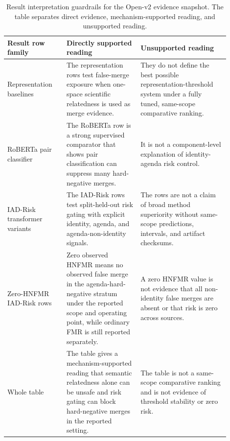 \documentclass[11pt]{article}
\begin{document}
\begin{table}[H]
\caption{Result interpretation guardrails for the Open-v2 evidence snapshot. The table separates direct evidence, mechanism-supported reading, and unsupported reading.}
\label{tab:result-interpretation-guardrails}
\centering
\footnotesize
\setlength{\tabcolsep}{3pt}
\begin{tabular}{L{0.24\linewidth}L{0.30\linewidth}L{0.36\linewidth}}
\toprule
Result row family & Directly supported reading & Unsupported reading \\
\midrule
Representation baselines & The representation rows test false-merge exposure when one-space scientific relatedness is used as merge evidence. & They do not define the best possible representation-threshold system under a fully tuned, same-scope comparative ranking. \\
RoBERTa pair classifier & The RoBERTa row is a strong supervised comparator that shows pair classification can suppress many hard-negative merges. & It is not a component-level explanation of identity-agenda risk control. \\
IAD-Risk transformer variants & The IAD-Risk rows test split-held-out risk gating with explicit identity, agenda, and agenda-non-identity signals. & The rows are not a claim of broad method superiority without same-scope predictions, intervals, and artifact checksums. \\
Zero-HNFMR IAD-Risk rows & Zero observed HNFMR means no observed false merge in the agenda-hard-negative stratum under the reported scope and operating point, while ordinary FMR is still reported separately. & A zero HNFMR value is not evidence that all non-identity false merges are absent or that risk is zero across sources. \\
Whole table & The table gives a mechanism-supported reading that semantic relatedness alone can be unsafe and risk gating can block hard-negative merges in the reported setting. & The table is not a same-scope comparative ranking and is not evidence of threshold stability or zero risk. \\
\bottomrule
\end{tabular}
\end{table}
\end{document}
